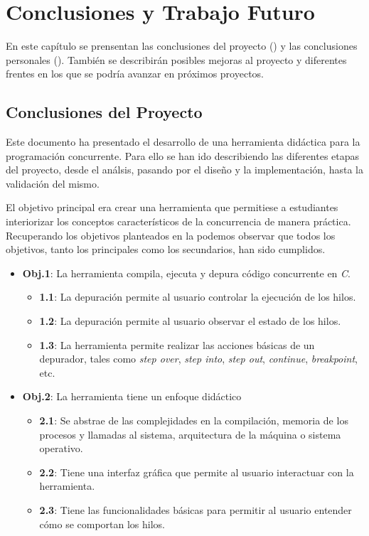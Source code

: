 \chapter{Conclusiones y Trabajo Futuro}\label{chap:conclusiones}
En este capítulo se prensentan las conclusiones del proyecto () y las conclusiones personales (). También se describirán posibles mejoras al proyecto y diferentes frentes en los que se podría avanzar en próximos proyectos.

\section{Conclusiones del Proyecto}\label{sec:conclusiones_proyecto}

Este documento ha presentado el desarrollo de una herramienta didáctica para la programación concurrente. Para ello se han ido describiendo las diferentes etapas del proyecto, desde el análsis, pasando por el diseño y la implementación, hasta la validación del mismo.

El objetivo principal era crear una herramienta que permitiese a estudiantes interiorizar los conceptos característicos de la concurrencia de manera práctica. Recuperando los objetivos planteados en la  podemos observar que todos los objetivos, tanto los principales como los secundarios, han sido cumplidos.

\begin{itemize}
    \item \textbf{Obj.1}: La herramienta compila, ejecuta y depura código concurrente en \textit{C}.
    \begin{itemize}
        \item \textbf{1.1}: La depuración permite al usuario controlar la ejecución de los hilos.
        \item \textbf{1.2}: La depuración permite al usuario observar el estado de los hilos.
        \item \textbf{1.3}: La herramienta permite realizar las acciones básicas de un depurador, tales como \textit{step over}, \textit{step into}, \textit{step out}, \textit{continue}, \textit{breakpoint}, etc.
    \end{itemize}
    
    \item \textbf{Obj.2}: La herramienta tiene un enfoque didáctico\label{obj:didactico}
    \begin{itemize}
        \item \textbf{2.1}: Se abstrae de las complejidades en la compilación, memoria de los procesos y llamadas al sistema, arquitectura de la máquina o sistema operativo.
        \item \textbf{2.2}: Tiene una interfaz gráfica que permite al usuario interactuar con la herramienta.
        \item \textbf{2.3}: Tiene las funcionalidades básicas para permitir al usuario entender cómo se comportan los hilos.
    \end{itemize}
\end{itemize}

